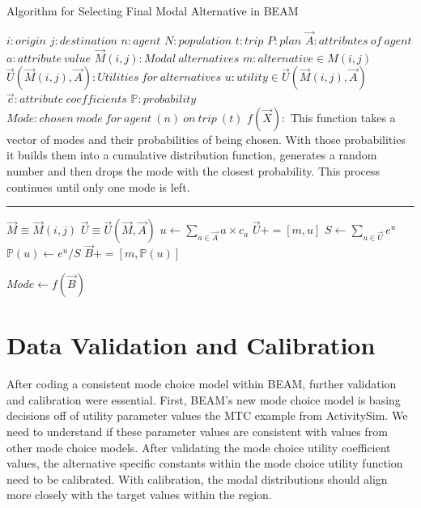 \documentclass[12pt, oneside, openright]{byuthesis}
\begin{document}
\begin{algorithm}
\caption{Algorithm for Selecting Final Modal Alternative in BEAM}
\begin{algorithmic}[1]
\Require
\State $i : origin$
\State $j : destination$
\State $n: agent$
\State $N: population$
\State $t : trip $
\State $P : plan$
\State $\vec{A}: attributes\:of\:agent$
\State $a: attribute\:value$
\State $\vec{M}(i,j) : Modal\:alternatives$
\State $m : alternative \in M(i,j)$
\State $\vec{U}(\vec{M}(i,j),\vec{A}):Utilities\:for\:alternatives$
\State $u: utility \in \vec{U}(\vec{M}(i,j),\vec{A})$
\State $\vec{c}: attribute\:coefficients$
\State $\mathds{P}: probability$
\State $Mode: chosen\:mode\:for\:agent\:(n)\:on\:trip\:(t)$
\State $f(\vec{X}):$
This function takes a vector of modes and  their probabilities of being chosen. With those probabilities it builds them into a cumulative distribution function, generates a random number and then drops the mode with the closest probability. This process continues until only one mode is left.
\vspace{4pt}\hrule\vspace{5pt}

\State $\vec{M} \equiv \vec{M}(i,j)$
\State $\vec{U} \equiv \vec{U}(\vec{M},\vec{A})$
  \State $u \gets \sum_{a\in \vec{A}} a \times c_a$
  \State $\vec{U} += [m,u]$
\EndFor
\State $S \gets \sum_{u\in \vec{U}}e^u$
    \State $\mathds{P}(u)\gets e^u / S$
    \State $\vec{B} +=[m, \mathds{P}(u)]$
\EndFor 

\State $Mode \gets f(\vec{B})$

\EndProcedure

\EndFor
\EndFor
\Statex
\end{algorithmic}
\end{algorithm}

\hypertarget{mcalib}{%
\section{Data Validation and Calibration}\label{mcalib}}

After coding a consistent mode choice model within BEAM, further validation and calibration were essential. First, BEAM's new mode choice model is basing decisions off of utility parameter values the MTC example from ActivitySim. We need to understand if these parameter values are consistent with values from other mode choice models. After validating the mode choice utility coefficient values, the alternative specific constants within the mode choice utility function need to be calibrated. With calibration, the modal distributions should align more closely with the target values within the region.
\end{document}
